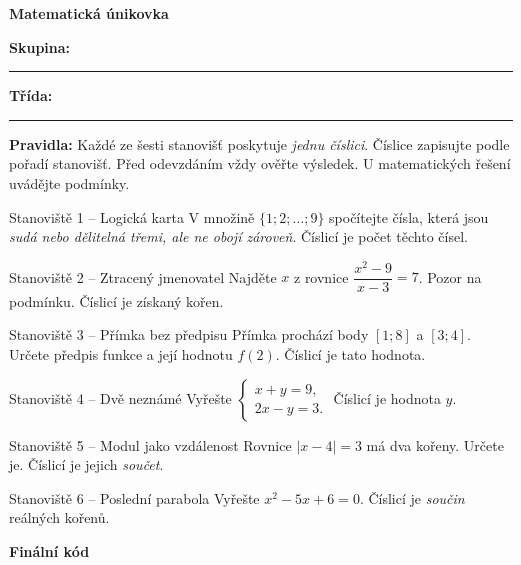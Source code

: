 \documentclass[11pt,a4paper]{article}
\begin{document}
\begin{center}{\LARGE\bfseries Matematická únikovka}\par{}\end{center}
\textbf{Skupina:} \rule{75mm}{0.4pt}\hfill\textbf{Třída:} \rule{24mm}{0.4pt}

\textbf{Pravidla:} Každé ze šesti stanovišť poskytuje \emph{jednu číslici}. Číslice zapisujte podle pořadí stanovišť. Před odevzdáním vždy ověřte výsledek. U matematických řešení uvádějte podmínky.

\begin{stanoviste}{Stanoviště 1 -- Logická karta}
V množině $\{1;2;\dots;9\}$ spočítejte čísla, která jsou \emph{sudá nebo dělitelná třemi, ale ne obojí zároveň}. Číslicí je počet těchto čísel.\par\vspace{8mm}\end{stanoviste}
\begin{stanoviste}{Stanoviště 2 -- Ztracený jmenovatel}
Najděte $x$ z rovnice $\dfrac{x^2-9}{x-3}=7$. Pozor na podmínku. Číslicí je získaný kořen.\par\vspace{8mm}\end{stanoviste}
\begin{stanoviste}{Stanoviště 3 -- Přímka bez předpisu}
Přímka prochází body $[1;8]$ a $[3;4]$. Určete předpis funkce a její hodnotu $f(2)$. Číslicí je tato hodnota.\par\vspace{8mm}\end{stanoviste}
\begin{stanoviste}{Stanoviště 4 -- Dvě neznámé}
Vyřešte $\begin{cases}x+y=9,\\2x-y=3.\end{cases}$ Číslicí je hodnota $y$.\par\vspace{8mm}\end{stanoviste}
\begin{stanoviste}{Stanoviště 5 -- Modul jako vzdálenost}
Rovnice $|x-4|=3$ má dva kořeny. Určete je. Číslicí je jejich \emph{součet}.\par\vspace{8mm}\end{stanoviste}
\begin{stanoviste}{Stanoviště 6 -- Poslední parabola}
Vyřešte $x^2-5x+6=0$. Číslicí je \emph{součin} reálných kořenů.\par\vspace{8mm}\end{stanoviste}
\bigskip
\begin{center}
{\Large\bfseries Finální kód}\par\vspace{3mm}
\begin{tabular}{|p{1.05cm}|p{1.05cm}|p{1.05cm}|p{1.05cm}|p{1.05cm}|p{1.05cm}|}\hline\rule{0pt}{12mm} & & & & & \\\hline\end{tabular}
\end{center}
\end{document}
